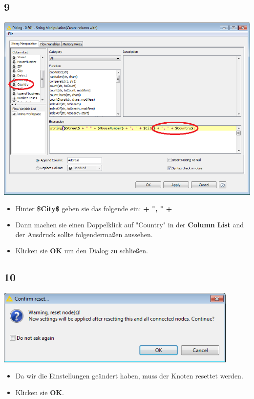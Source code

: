 \documentclass{beamer}
\begin{document}
\subsection{9}
\begin{frame}
	\begin{center}
  		\includegraphics[height=0.6\textheight]{9.png}
	\end{center}
	\begin{itemize}
		\item Hinter \textbf{\$City\$} geben sie das folgende ein: \textbf{+ ", " +}
		\item Dann machen sie einen Doppelklick auf "Country" in der \textbf{Column List} and der Ausdruck sollte folgendermaßen aussehen.
		\item Klicken sie \textbf{OK} um den Dialog zu schließen.
	\end{itemize}
\end{frame}

\subsection{10}
\begin{frame}
	\begin{center}
  		\includegraphics[width=0.9\textwidth]{10.png}
	\end{center}
	\begin{itemize}
		\item Da wir die Einstellungen geändert haben, muss der Knoten resettet werden. 
		\item Klicken sie \textbf{OK}.
	\end{itemize}
\end{frame}
\end{document}
